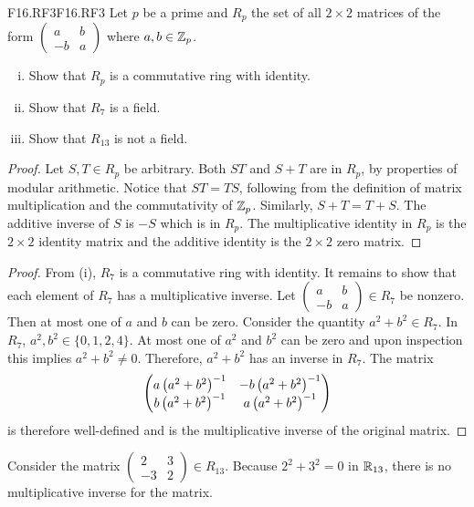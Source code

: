 \documentclass[../AlgebraQualSolutions.tex]{subfiles}
\begin{document}
\begin{prob}{F16.RF3}{F16.RF3}
    Let $p$ be a prime and $R_p$ the set of all $2 \times 2$ matrices of the form $\begin{pmatrix} a & b\\ -b & a\end{pmatrix}$ where $a,b \in \mathbb{Z}_p$.

    \begin{enumerate}[(i)]
        \item Show that $R_p$ is a commutative ring with identity.
        \item Show that $R_7$ is a field.
        \item Show that $R_{13}$ is not a field.
    \end{enumerate}
\end{prob}

\begin{proof}
    Let $S,T \in R_p$ be arbitrary. Both $ST$ and $S + T$ are in $R_p$, by properties of modular arithmetic. Notice that $ST = TS$, following from the definition of matrix multiplication and the commutativity of $\mathbb{Z}_p$. Similarly, $S + T = T + S$. The additive inverse of $S$ is $-S$ which is in $R_p$. The multiplicative identity in $R_p$ is the $2 \times 2$ identity matrix and the additive identity is the $2 \times 2$ zero matrix.
\end{proof}

\begin{proof}
    From (i), $R_7$ is a commutative ring with identity. It remains to show that each element of $R_7$ has a multiplicative inverse. Let $\begin{pmatrix} a & b\\ -b & a\end{pmatrix} \in R_7$ be nonzero. Then at most one of $a$ and $b$ can be zero. Consider the quantity $a^2 + b^2 \in R_7$. In $R_7$, $a^2,b^2 \in \{0, 1, 2, 4\}$. At most one of $a^2$ and $b^2$ can be zero and upon inspection this implies $a^2 + b^2 \neq 0$. Therefore, $a^2 + b^2$ has an inverse in $R_7$. The matrix 
        \[\begin{pmatrix}
            a \left(a^2 + b^2\right)^{-1} & -b \left(a^2 + b^2\right)^{-1}\\
            b\left(a^2 + b^2\right)^{-1} & a\left(a^2 + b^2\right)^{-1}
        \end{pmatrix}\]
    is therefore well-defined and is the multiplicative inverse of the original matrix.
\end{proof}

\begin{solution}
    Consider the matrix $\begin{pmatrix} 2 & 3\\ -3 & 2\end{pmatrix} \in R_{13}$. Because $2^2 + 3^2 = 0$ in $\mathbb{R}_{13}$, there is no multiplicative inverse for the matrix.
\end{solution}
\end{document}
